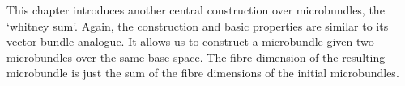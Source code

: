\begin{myparagraph}
    This chapter introduces another central construction over microbundles, the `whitney sum'.
    Again, the construction and basic properties are similar to its vector bundle analogue.
    It allows us to construct a microbundle given two microbundles over the same base space.
    The fibre dimension of the resulting microbundle
    is just the sum of the fibre dimensions of the initial microbundles.
\end{myparagraph}


